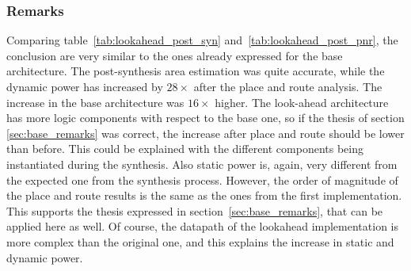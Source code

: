 \documentclass[a4paper]{article}
\begin{document}
\subsubsection{Remarks}
Comparing table~\ref{tab:lookahead_post_syn} and~\ref{tab:lookahead_post_pnr}, the conclusion are very similar to the ones already expressed for the base architecture. The post-synthesis area estimation was quite accurate, while the dynamic power has increased by $28\times$ after the place and route analysis. The increase in the base architecture was $16\times$ higher. The look-ahead architecture has more logic components with respect to the base one, so if the thesis of section \ref{sec:base_remarks} was correct, the increase after place and route should be lower than before. This could be explained with the different components being instantiated during the synthesis. Also static power is, again, very different from the expected one from the synthesis process. However, the order of magnitude of the place and route results is the same as the ones from the first implementation. This supports the thesis expressed in section~\ref{sec:base_remarks}, that can be applied here as well. Of course, the datapath of the lookahead implementation is more complex than the original one, and this explains the increase in static and dynamic power. 
\end{document}
